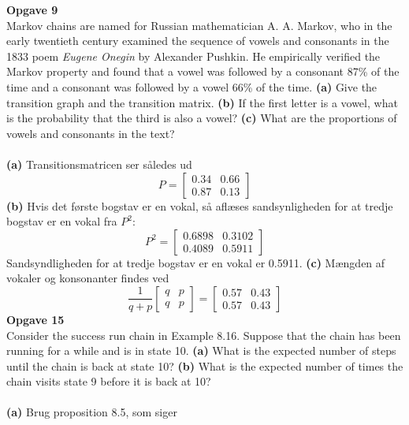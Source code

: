 \documentclass[12pt,a4paper,draft]{report}
\author{Frederik Appel Vardinghus-Nielsen}
\begin{document}
\noindent\textbf{Opgave 9}\\
Markov chains are named for Russian mathematician A. A. Markov, who in the early twentieth century examined the sequence of vowels and consonants in the 1833 poem \textit{Eugene Onegin} by Alexander Pushkin. He empirically verified the Markov property and found that a vowel was followed by a consonant 87\% of the time and a consonant was followed by a vowel 66\% of the time. \textbf{(a)} Give the transition graph and the transition matrix. \textbf{(b)} If the first letter is a vowel, what is the probability that the third is also a vowel? \textbf{(c)} What are the proportions of vowels and consonants in the text?\\\\
\textbf{(a)} Transitionsmatricen ser således ud
\begin{equation}
P=\begin{bmatrix}
0.34 & 0.66\\
0.87 & 0.13
\end{bmatrix}
\end{equation}
\textbf{(b)} Hvis det første bogstav er en vokal, så aflæses sandsynligheden for at tredje bogstav er en vokal fra $P^2$:
\begin{equation}
P^2=\begin{bmatrix}
0.6898 & 0.3102\\
0.4089 & 0.5911
\end{bmatrix}
\end{equation}
Sandsyndligheden for at tredje bogstav er en vokal er 0.5911.
\textbf{(c)} Mængden af vokaler og konsonanter findes ved
\begin{equation}
\frac{1}{q+p}\begin{bmatrix}
q & p\\
q & p
\end{bmatrix}=\begin{bmatrix}
0.57 & 0.43\\
0.57 & 0.43
\end{bmatrix}
\end{equation}
\textbf{Opgave 15}\\
Consider the success run chain in Example 8.16. Suppose that the chain has been running for a while and is in state 10. \textbf{(a)} What is the expected number
of steps until the chain is back at state 10? \textbf{(b)} What is the expected number of times the chain visits state 9 before it is back at 10?\\\\
\textbf{(a)} Brug proposition 8.5, som siger
\end{document}
